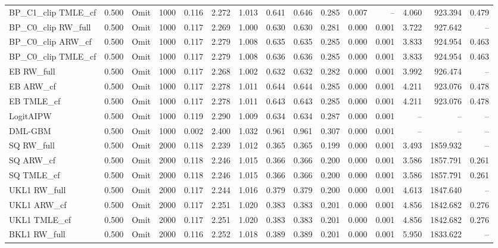 \begin{tabular}{llllrrrrrrrrrrr}
BP\_C1\_clip TMLE\_cf & 0.500 & Omit & 1000 & 0.116 & 2.272 & 1.013 & 0.641 & 0.646 & 0.285 & 0.007 & -- & 4.060 & 923.394 & 0.479 \\
BP\_C0\_clip RW\_full & 0.500 & Omit & 1000 & 0.117 & 2.269 & 1.000 & 0.630 & 0.630 & 0.281 & 0.000 & 0.001 & 3.722 & 927.642 & -- \\
BP\_C0\_clip ARW\_cf & 0.500 & Omit & 1000 & 0.117 & 2.279 & 1.008 & 0.635 & 0.635 & 0.285 & 0.000 & 0.001 & 3.833 & 924.954 & 0.463 \\
BP\_C0\_clip TMLE\_cf & 0.500 & Omit & 1000 & 0.117 & 2.279 & 1.008 & 0.636 & 0.636 & 0.285 & 0.000 & 0.001 & 3.833 & 924.954 & 0.463 \\
EB RW\_full & 0.500 & Omit & 1000 & 0.117 & 2.268 & 1.002 & 0.632 & 0.632 & 0.282 & 0.000 & 0.001 & 3.992 & 926.474 & -- \\
EB ARW\_cf & 0.500 & Omit & 1000 & 0.117 & 2.278 & 1.011 & 0.644 & 0.644 & 0.285 & 0.000 & 0.001 & 4.211 & 923.076 & 0.478 \\
EB TMLE\_cf & 0.500 & Omit & 1000 & 0.117 & 2.278 & 1.011 & 0.643 & 0.643 & 0.285 & 0.000 & 0.001 & 4.211 & 923.076 & 0.478 \\
LogitAIPW & 0.500 & Omit & 1000 & 0.119 & 2.290 & 1.009 & 0.634 & 0.634 & 0.287 & 0.000 & 0.001 & -- & -- & -- \\
DML-GBM & 0.500 & Omit & 1000 & 0.002 & 2.400 & 1.032 & 0.961 & 0.961 & 0.307 & 0.000 & 0.001 & -- & -- & -- \\
SQ RW\_full & 0.500 & Omit & 2000 & 0.118 & 2.239 & 1.012 & 0.365 & 0.365 & 0.199 & 0.000 & 0.001 & 3.493 & 1859.932 & -- \\
SQ ARW\_cf & 0.500 & Omit & 2000 & 0.118 & 2.246 & 1.015 & 0.366 & 0.366 & 0.200 & 0.000 & 0.001 & 3.586 & 1857.791 & 0.261 \\
SQ TMLE\_cf & 0.500 & Omit & 2000 & 0.118 & 2.246 & 1.015 & 0.366 & 0.366 & 0.200 & 0.000 & 0.001 & 3.586 & 1857.791 & 0.261 \\
UKL1 RW\_full & 0.500 & Omit & 2000 & 0.117 & 2.244 & 1.016 & 0.379 & 0.379 & 0.200 & 0.000 & 0.001 & 4.613 & 1847.640 & -- \\
UKL1 ARW\_cf & 0.500 & Omit & 2000 & 0.117 & 2.251 & 1.020 & 0.383 & 0.383 & 0.201 & 0.000 & 0.001 & 4.856 & 1842.682 & 0.276 \\
UKL1 TMLE\_cf & 0.500 & Omit & 2000 & 0.117 & 2.251 & 1.020 & 0.383 & 0.383 & 0.201 & 0.000 & 0.001 & 4.856 & 1842.682 & 0.276 \\
BKL1 RW\_full & 0.500 & Omit & 2000 & 0.116 & 2.252 & 1.018 & 0.389 & 0.389 & 0.201 & 0.000 & 0.001 & 5.950 & 1833.622 & -- \\

\end{tabular}
